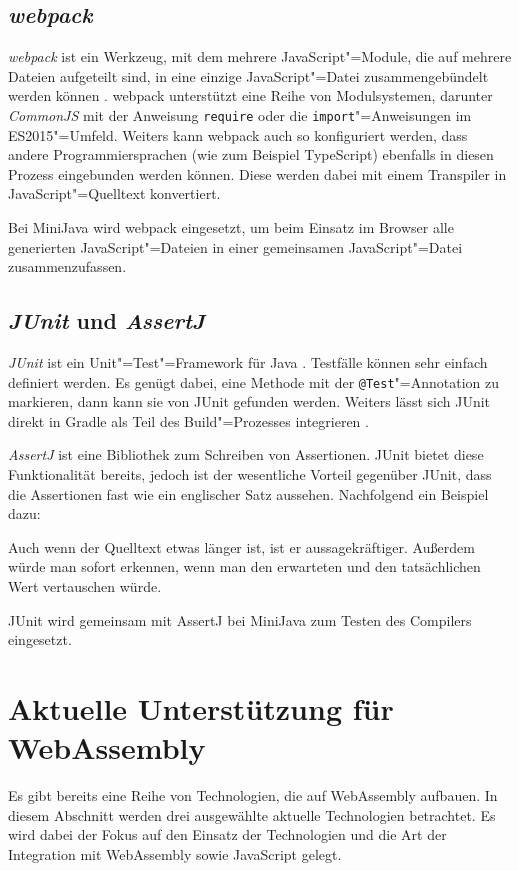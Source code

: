 \subsection{\emph{webpack}}
\emph{webpack} ist ein Werkzeug, mit dem mehrere JavaScript"=Module, die auf mehrere Dateien aufgeteilt sind, in eine einzige JavaScript"=Datei zusammengebündelt werden können \cite{Webpack}. webpack unterstützt eine Reihe von Modulsystemen, darunter \emph{CommonJS} mit der Anweisung \lstinline{require} oder die \lstinline{import}"=Anweisungen im ES2015"=Umfeld. Weiters kann webpack auch so konfiguriert werden, dass andere Programmiersprachen (wie zum Beispiel TypeScript) ebenfalls in diesen Prozess eingebunden werden können. Diese werden dabei mit einem Transpiler in JavaScript"=Quelltext konvertiert.

Bei MiniJava wird webpack eingesetzt, um beim Einsatz im Browser alle generierten JavaScript"=Dateien in einer gemeinsamen JavaScript"=Datei zusammenzufassen.

\subsection{\emph{JUnit} und \emph{AssertJ}}
\emph{JUnit} ist ein Unit"=Test"=Framework für Java \cite{JUnit}. Testfälle können sehr einfach definiert werden. Es genügt dabei, eine Methode mit der \lstinline{@Test}"=Annotation zu markieren, dann kann sie von JUnit gefunden werden. Weiters lässt sich JUnit direkt in Gradle als Teil des Build"=Prozesses integrieren \cite{Gradle}.

\emph{AssertJ} ist eine Bibliothek zum Schreiben von Assertionen. JUnit bietet diese Funktionalität bereits, jedoch ist der wesentliche Vorteil gegenüber JUnit, dass die Assertionen fast wie ein englischer Satz aussehen. Nachfolgend ein Beispiel dazu:



Auch wenn der Quelltext etwas länger ist, ist er aussagekräftiger. Außerdem würde man sofort erkennen, wenn man den erwarteten und den tatsächlichen Wert vertauschen würde.

JUnit wird gemeinsam mit AssertJ bei MiniJava zum Testen des Compilers eingesetzt.

\pagebreak
\section{Aktuelle Unterstützung für WebAssembly}
Es gibt bereits eine Reihe von Technologien, die auf WebAssembly aufbauen. In diesem Abschnitt werden drei ausgewählte aktuelle Technologien betrachtet. Es wird dabei der Fokus auf den Einsatz der Technologien und die Art der Integration mit WebAssembly sowie JavaScript gelegt.


